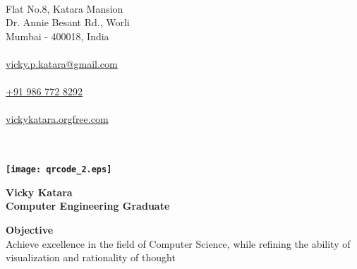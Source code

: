 \documentclass[a4paper,12pt,final]{memoir}
\newcommand{\Sep}{\vspace{1.5em}}
\newcommand{\SmallSep}{\vspace{0.5em}}
\newenvironment{Objective}
	{\ignorespaces\textbf{\color{Plum} Objective}}
	{\Sep\ignorespacesafterend}
\begin{document}

\begin{flushright} 
	\footnotesize
	\SmallSep
	{\bfseries{\color{Plum}{Address}}}\\
	
	Flat No.8, Katara Mansion\\
	Dr. Annie Besant Rd., Worli\\
	Mumbai - 400018, India\\
	\Sep
	{\bfseries{\color{Plum}{EMail}}}\\
	\href{mailto:vicky.p.katara@gmail.com}{vicky.p.katara@gmail.com}\\
	\Sep
	{\bfseries{\color{Plum}{Cellphone}}}\\
	\href{tel:+919867728292}{+91 986 772 8292}\\
	\Sep
		{\bfseries{\color{Plum}{Website}}}\\
	\href{http://vickykatara.orgfree.com/}{vickykatara.orgfree.com}\\
\end{flushright}\normalsize
	\hspace{0.7cm}
		\vspace{-0.25cm}
	\bfseries{\color{Plum}{Contact Information}}\\\\
	\vspace{0cm}
	\hspace{0.5cm}
	\texttt{[image: qrcode\_2.eps]}
\framebreak

\Huge\bfseries {\color{Plum} Vicky Katara} \\
\Large\bfseries  Computer Engineering Graduate \\

\normalsize\normalfont

\begin{Objective}
\\Achieve excellence in the field of Computer Science, while refining the \allowbreak ability of visualization and rationality of thought
\end{Objective}
\end{document}
